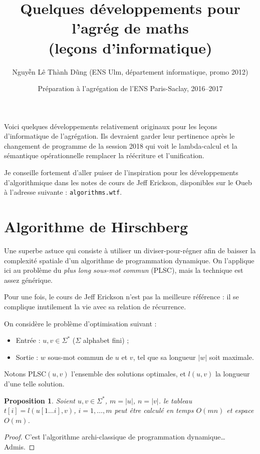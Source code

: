 \documentclass[a4paper, 11pt]{article}
\newtheorem*{proposition}{Proposition}
\begin{document}
\title{Quelques développements pour l'agrég de maths\\(leçons d'informatique)}
\author{Nguyễn Lê Thành Dũng (ENS Ulm, département informatique, promo 2012)}
\date{Préparation à l'agrégation de l'ENS Paris-Saclay, 2016--2017}
\maketitle

Voici quelques développements relativement originaux pour les leçons
d'informatique de l'agrégation. Ils devraient garder leur pertinence après le
changement de programme de la session 2018 qui voit le lambda-calcul et la
sémantique opérationnelle remplacer la réécriture et l'unification.

Je conseille fortement d'aller puiser de l'inspiration pour les développements
d'algorithmique dans les notes de cours de Jeff Erickson, disponibles sur le
Oueb à l'adresse suivante : \texttt{algorithms.wtf}.

\tableofcontents

\newpage

\section{Algorithme de Hirschberg}

Une superbe astuce qui consiste à utiliser un diviser-pour-régner afin de
baisser la complexité spatiale d'un algorithme de programmation dynamique. On
l'applique ici au problème du \emph{plus long sous-mot commun} (PLSC), mais la
technique est assez générique.

Pour une fois, le cours de Jeff Erickson n'est pas la meilleure référence : il
se complique inutilement la vie avec sa relation de récurrence.

On considère le problème d'optimisation suivant :
\begin{itemize}
\item Entrée : $u, v \in \Sigma^*$ ($\Sigma$ alphabet fini) ;
\item Sortie : $w$ sous-mot commun de $u$ et $v$, tel que sa longueur $|w|$ soit
  maximale.
\end{itemize}
Notons $\mathrm{PLSC}(u,v)$ l'ensemble des solutions optimales, et $l(u,v)$ la
longueur d'une telle solution.

\begin{proposition}
  Soient $u, v \in \Sigma^*$, $m = |u|$, $n = |v|$. le tableau $t[i] = l(u[1 …
  i], v)$, $i = 1, …, m$ peut être calculé en temps $O(mn)$ et espace $O(m)$.
\end{proposition}
\begin{proof}
  C'est l'algorithme archi-classique de programmation dynamique… Admis.
\end{proof}
\end{document}
